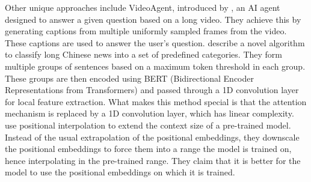 	Other unique approaches include VideoAgent, introduced by \citet{wang2024videoagent}, an
	AI agent designed to answer a given question based on a long video.
	They achieve this by generating captions from multiple uniformly sampled frames from the
	video.
	These captions are used to answer the user's question.
	\citet{chen2022long} describe a novel algorithm to classify long Chinese news into a set
	of predefined categories.
	They form multiple groups of sentences based on a maximum token threshold in each group.
	These groups are then encoded using BERT (Bidirectional Encoder Representations from
	Transformers) and passed through a 1D convolution layer for local feature extraction.
	What makes this method special is that the attention mechanism is replaced by a 1D
	convolution layer, which has linear complexity.
	\citet{chen2023extending} use positional interpolation to extend the context size of a
	pre-trained model.
	Instead of the usual extrapolation of the positional embeddings, they downscale the positional
	embeddings to force them into a range the model is trained on, hence interpolating in the
	pre-trained range.
	They claim that it is better for the model to use the positional embeddings on which it is trained.
